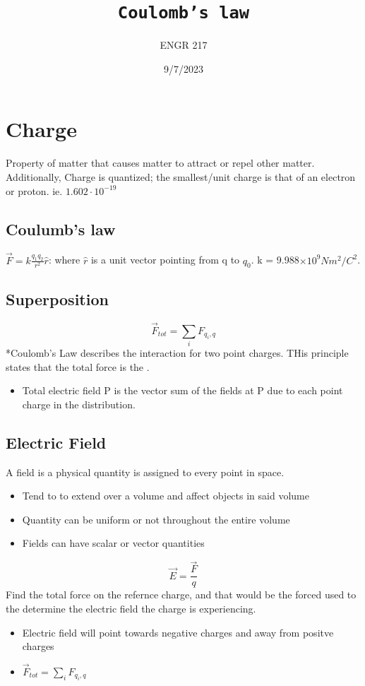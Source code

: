 \documentclass[a4paper,12pt]{article}
\title{\texttt{Coulomb's law}\\\hrulefill}
\author{ENGR 217}
\date{\small{9/7/2023}}
\begin{document}
    \maketitle

    \section{Charge}
        Property of matter that causes matter to attract or repel other matter. Additionally, Charge is quantized; the smallest/unit charge is that of an electron or proton. ie. $1.602 \cdot 10^{-19}$

        \subsection*{Coulumb's law}
            $\vec{F}=k\frac{q_1q_2}{r^2}\hat{r}$: where $\hat{r}$ is a unit vector pointing from q to $q_0$. k = 9.988$\times 10^9Nm^2/C^2$.

        \subsection*{Superposition}
        \[\vec{F}_{tot}=\sum_{i}^{}F_{q_i,q}\]
            *Coulomb's Law describes the interaction for two point charges. THis principle states that the total force is the .
            \begin{itemize}
                \item Total electric field P is the vector sum of the fields at P due to each point charge in the distribution.                
            \end{itemize}

        \subsection*{Electric Field}
        A field is a physical quantity is assigned to every point in space.
        \begin{itemize}
            \item Tend to to extend over a volume and affect objects in said volume
            \item Quantity can be uniform or not throughout the entire volume
            \item Fields can have scalar or vector quantities
        \end{itemize}
        \[\vec{E}=\frac{\vec{F}}{q}\]
        Find the total force on the refernce charge, and that would be the forced used to the determine the electric field the charge is experiencing.
        \begin{itemize}
            \item Electric field will point towards negative charges and away from positve charges
            \item \(\vec{F}_{tot}=\sum_{i}^{}F_{q_i,q}\)
        \end{itemize}
\end{document}
